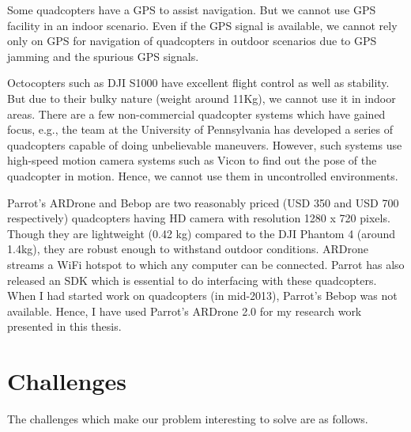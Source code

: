 Some quadcopters have a GPS to assist navigation. But we cannot use
GPS facility in an indoor scenario. Even if the GPS signal is
available, we cannot rely only on GPS for navigation of quadcopters in
outdoor scenarios due to GPS jamming and the spurious GPS signals.

Octocopters such as DJI S1000 have excellent flight control as well as
stability. But due to their bulky nature (weight around 11Kg), we
cannot use it in indoor areas. There are a few non-commercial
quadcopter systems which have gained focus, e.g., the team at the
University of Pennsylvania has developed a series of quadcopters
capable of doing unbelievable maneuvers. However, such systems use
high-speed motion camera systems such as Vicon to find out the pose of
the quadcopter in motion. Hence, we cannot use them in uncontrolled
environments.

Parrot's ARDrone and Bebop are two reasonably priced (USD 350 and USD
700 respectively) quadcopters having HD camera with resolution 1280 x 720
pixels. Though they are lightweight (0.42 kg) compared to the DJI Phantom 4
(around 1.4kg), they are robust enough to withstand outdoor conditions. ARDrone
streams a WiFi hotspot to which any computer can be connected. Parrot has also
released an SDK which is essential to do interfacing with these quadcopters.
When I had started work on quadcopters (in mid-2013), Parrot's Bebop was not
available. Hence, I have used Parrot's ARDrone 2.0 for my research work
presented in this thesis.

\section{Challenges}
\label{sec:challenges}
The challenges which make our problem interesting to solve are as follows.

